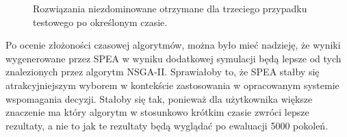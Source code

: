 \documentclass[twoside]{iisthesis}
\begin{document}
\begin{figure}
    \hfill
{}
    \hfill
{}
    \hfill
{}
\caption{Rozwiązania niezdominowane otrzymane dla trzeciego przypadku testowego po określonym czasie.}
    \label{fig:big_time_results}
\end{figure}
Po ocenie złożoności czasowej algorytmów, można było mieć nadzieję, że wyniki wygenerowane przez SPEA w wyniku dodatkowej symulacji będą lepsze od tych znalezionych przez algorytm NSGA-II. Sprawiałoby to, że SPEA stałby się atrakcyjniejszym wyborem w kontekście zastosowania w opracowanym systemie wspomagania decyzji. Stałoby się tak, ponieważ dla użytkownika większe znaczenie ma który algorytm w stosunkowo krótkim czasie zwróci lepsze rezultaty, a nie to jak te rezultaty będą wyglądać po ewaluacji 5000 pokoleń.
\end{document}
